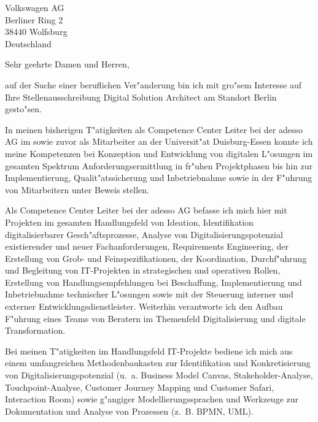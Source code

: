 \documentclass[11pt,a4paper]{dinbrief}
\date{\today}
\begin{document}
 
\begin{letter}  
{%
	Volkswagen AG\\
	Berliner Ring 2\\ 
	38440 Wolfsburg\\
	Deutschland
}
\subject{\bf Bewerbung Digital Solution Architect}
\opening{Sehr geehrte Damen und Herren,}
auf der Suche einer beruflichen Ver"anderung bin ich mit gro"sem Interesse auf Ihre Stellenausschreibung Digital Solution Architect am Standort Berlin  gesto"sen. 

In meinen bisherigen T"atigkeiten als Competence Center Leiter bei der adesso AG im sowie zuvor als Mitarbeiter an der Universit"at Duisburg-Essen konnte ich meine Kompetenzen bei Konzeption und Entwicklung von digitalen L"osungen im gesamten Spektrum Anforderungsermittlung in fr"uhen Projektphasen bis hin zur Implementierung, Qualit"atssicherung und Inbetriebnahme sowie in der F"uhrung von Mitarbeitern unter Beweis stellen.


Als Competence Center Leiter bei der adesso AG befasse ich mich hier mit Projekten im gesamten Handlungsfeld von Ideation, Identifikation digitalisierbarer Gesch"aftsprozesse, Analyse von Digitalisierungspotenzial existierender und neuer Fachanforderungen, Requirements Engineering, der Erstellung von Grob- und Feinspezifikationen, der Koordination, Durchf"uhrung und Begleitung von IT-Projekten in strategischen und operativen Rollen, Erstellung von Handlungsempfehlungen bei Beschaffung, Implementierung und Inbetriebnahme technischer L"osungen sowie mit der Steuerung interner und externer Entwicklungsdienstleister. Weiterhin verantworte ich den Aufbau F"uhrung eines Teams von Beratern im Themenfeld Digitalisierung und digitale Transformation.

Bei meinen T"atigkeiten im Handlungsfeld IT-Projekte bediene ich mich aus einem umfangreichen Methodenbaukasten zur Identifikation und Konkretisierung von Digitalisierungspotenzial (u.~a. Business Model Canvas, Stakeholder-Analyse, Touchpoint-Analyse, Customer Journey Mapping und Customer Safari, Interaction Room) sowie g"angiger Modellierungssprachen und Werkzeuge zur Dokumentation und Analyse von Prozessen (z.~B. BPMN, UML).


\end{letter}
\end{document}
